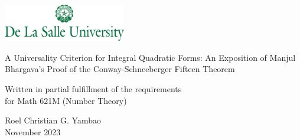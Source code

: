 \thispagestyle{empty}
{\centering



    {
        \includegraphics[width=0.4\textwidth]{assets/dlsu-banner.jpeg}
    }

    \vspace*{1.5in}

    {
       A Universality Criterion for Integral Quadratic Forms: An Exposition of Manjul Bhargava's Proof of the Conway-Schneeberger Fifteen Theorem
    }

    \vspace*{0.5in}


    {
    
       Written in partial fulfillment of the requirements\\
       for Math 621M (Number Theory)
    }

    \vspace*{\fill}

    {
    
    Roel Christian G. Yambao\\
    November 2023
    }
    
}